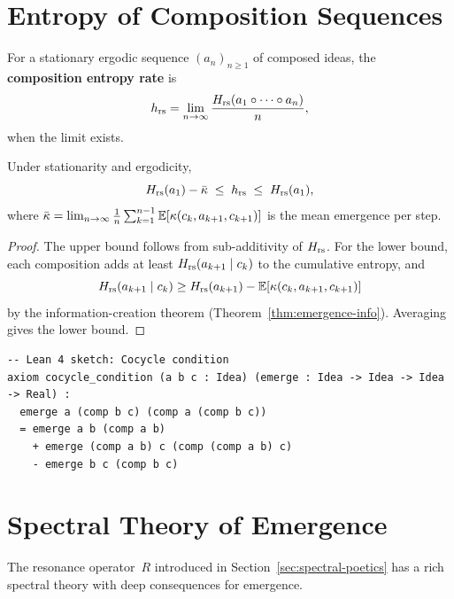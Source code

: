 \section{Entropy of Composition Sequences}
\label{sec:composition-entropy}

\begin{definition}
\label{def:entropy-rate}
For a stationary ergodic sequence $(a_n)_{n \ge 1}$ of composed
ideas, the \textbf{composition entropy rate} is
\[
  h_{\mathrm{rs}} = \lim_{n\to\infty}
  \frac{H_{\mathrm{rs}}(a_1 \circ \cdots \circ a_n)}{n},
\]
when the limit exists.
\end{definition}

\begin{theorem}
\label{thm:entropy-rate}
Under stationarity and ergodicity,
\[
  H_{\mathrm{rs}}(a_1) - \bar{\kappa}
  \;\le\; h_{\mathrm{rs}} \;\le\; H_{\mathrm{rs}}(a_1),
\]
where $\bar{\kappa} = \lim_{n\to\infty}
\frac{1}{n}\sum_{k=1}^{n-1}
\mathbb{E}[\kappa(c_k, a_{k+1}, c_{k+1})]$ is the
mean emergence per step.
\end{theorem}

\begin{proof}
The upper bound follows from sub-additivity of $H_{\mathrm{rs}}$.
For the lower bound, each composition adds at least
$H_{\mathrm{rs}}(a_{k+1} \mid c_k)$ to the cumulative entropy, and
\[
  H_{\mathrm{rs}}(a_{k+1}\mid c_k)
  \ge H_{\mathrm{rs}}(a_{k+1}) - \mathbb{E}[\kappa(c_k,a_{k+1},c_{k+1})]
\]
by the information-creation theorem (Theorem~\ref{thm:emergence-info}).
Averaging gives the lower bound.
\end{proof}

\begin{lstlisting}
-- Lean 4 sketch: Cocycle condition
axiom cocycle_condition (a b c : Idea) (emerge : Idea -> Idea -> Idea -> Real) :
  emerge a (comp b c) (comp a (comp b c))
  = emerge a b (comp a b)
    + emerge (comp a b) c (comp (comp a b) c)
    - emerge b c (comp b c)
\end{lstlisting}

\section{Spectral Theory of Emergence}
\label{sec:spectral-emergence}

The resonance operator~$R$ introduced in Section~\ref{sec:spectral-poetics}
has a rich spectral theory with deep consequences for emergence.

